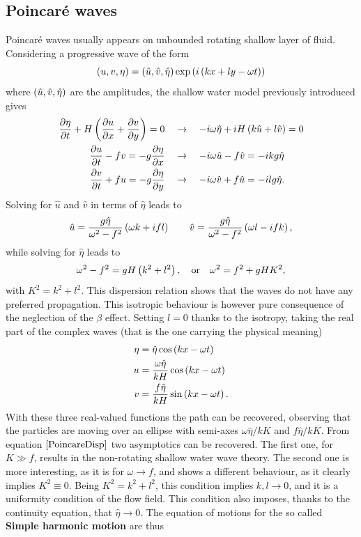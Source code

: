 \subsection{Poincar\'{e} waves}
Poincaré waves usually appears on unbounded rotating shallow layer of fluid. Considering a progressive wave of the form 
\begin{equation}
\left( u,v,\eta \right)=\left( \hat{u},\hat{v},\hat{\eta} \right)\text{exp}\left( i\left( kx+ly-\omega t \right) \right)
\end{equation}
where $\left( \hat{u},\hat{v},\hat{\eta} \right)$ are the amplitudes, the shallow water model previously introduced gives
\begin{align*}
\dfrac{\partial \eta}{\partial t}+H\left( \dfrac{\partial u}{\partial x}+\dfrac{\partial v}{\partial y} \right)=0 &\quad\rightarrow\quad -i\omega\hat{\eta}+iH\left( k\hat{u}+l\hat{v} \right)=0 \\
\dfrac{\partial u}{\partial t}-fv=-g\dfrac{\partial \eta}{\partial x}&\quad\rightarrow\quad -i\omega\hat{u}-f\hat{v}=-ikg\hat{\eta}\\
\dfrac{\partial v}{\partial t}+fu=-g\dfrac{\partial \eta}{\partial y}&\quad\rightarrow\quad -i\omega\hat{v}+f\hat{u}=-ilg\hat{\eta}.
\end{align*}
Solving for $\hat{u}$ and $\hat{v}$ in terms of $\hat{\eta}$ leads to
\begin{equation*}
\hat{u}=\dfrac{g\hat{\eta}}{\omega^{2}-f^{2}}\left( \omega k+ifl \right) \qquad 
\hat{v}=\dfrac{g\hat{\eta}}{\omega^{2}-f^{2}}\left( \omega l-ifk \right),
\end{equation*}
while solving for $\hat{\eta}$ leads to
\begin{equation}\label{PoincareDisp}
\omega^{2}-f^{2}=gH\left( k^{2}+l^{2} \right), \quad\text{or}\quad \omega^{2}=f^{2}+gHK^{2},
\end{equation}
with $K^{2}=k^{2}+l^{2}$. This dispersion relation shows that the waves do not have any preferred propagation. This isotropic behaviour is however pure consequence of the neglection of the $\beta$ effect. Setting $l=0$ thanks to the isotropy, taking the real part of the complex waves (that is the one carrying the physical meaning)
\begin{align*}
\eta&=\hat{\eta}\cos\left( kx-\omega t \right)\\
u&=\dfrac{\omega\hat{\eta}}{kH}\cos\left( kx-\omega t \right)\\
v&=\dfrac{f\hat{\eta}}{kH}\sin\left( kx-\omega t \right).
\end{align*}
With these three real-valued functions the path can be recovered, observing that the particles are moving over an ellipse with semi-axes $\omega\hat{\eta}/kK$ and $f\hat{\eta}/kK$. From equation $\eqref{PoincareDisp}$ two asymptotics can be recovered. The first one, for $K\gg f$, results in the non-rotating shallow water wave theory. The second one is more interesting, as it is for $\omega\rightarrow f$, and shows a different behaviour, as it clearly implies $K^{2}\equiv0$. Being $K^{2}=k^{2}+l^{2}$, this condition implies $k,l\rightarrow0$, and it is a uniformity condition of the flow field. This condition also imposes, thanks to the continuity equation, that $\hat{\eta}\rightarrow0$. The equation of motions for the so called \textbf{Simple harmonic motion} are thus
